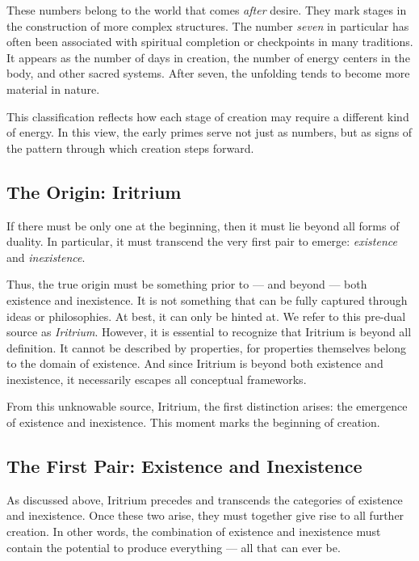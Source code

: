 These numbers belong to the world that comes \emph{after} desire. They mark stages in the construction of more complex structures. The number \emph{seven} in particular has often been associated with spiritual completion or checkpoints in many traditions. It appears as the number of days in creation, the number of energy centers in the body, and other sacred systems. After seven, the unfolding tends to become more material in nature.

This classification reflects how each stage of creation may require a different kind of energy. In this view, the early primes serve not just as numbers, but as signs of the pattern through which creation steps forward.

\subsection{The Origin: Iritrium}

If there must be only one at the beginning, then it must lie beyond all forms of duality. In particular, it must transcend the very first pair to emerge: \emph{existence} and \emph{inexistence}. 

Thus, the true origin must be something prior to — and beyond — both existence and inexistence. It is not something that can be fully captured through ideas or philosophies. At best, it can only be hinted at. We refer to this pre-dual source as \emph{Iritrium}. However, it is essential to recognize that Iritrium is beyond all definition. It cannot be described by properties, for properties themselves belong to the domain of existence. And since Iritrium is beyond both existence and inexistence, it necessarily escapes all conceptual frameworks.

From this unknowable source, Iritrium, the first distinction arises: the emergence of existence and inexistence. This moment marks the beginning of creation.

\subsection{The First Pair: Existence and Inexistence}

As discussed above, Iritrium precedes and transcends the categories of existence and inexistence. Once these two arise, they must together give rise to all further creation. In other words, the combination of existence and inexistence must contain the potential to produce everything — all that can ever be.

